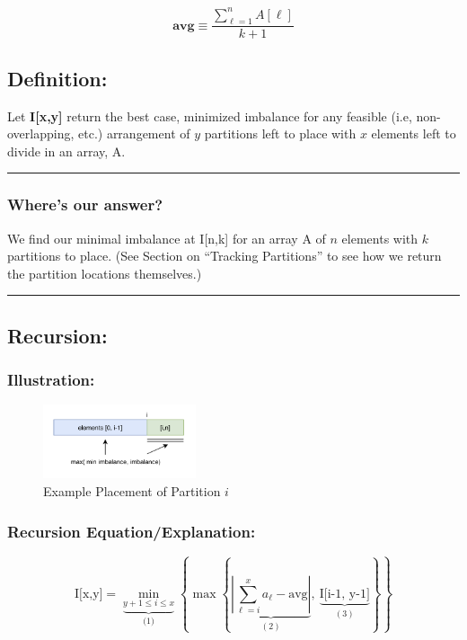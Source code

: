 \documentclass[conference]{styles/acmsiggraph}
\newcommand{\?}{\stackrel{?}{=}}
\begin{document}
$$\mathbf{avg} \equiv \frac{\sum^{n}_{\ell = 1}A[\ell]}{k+1}$$

\subsection{Definition:} \label{ImbalanceDef}
Let \textbf{I[x,y]} return the best case, minimized imbalance for any feasible (i.e, non-overlapping, etc.) arrangement of $y$ partitions left to place with $x$ elements left to divide in an array, A. \\

\rule{\textwidth}{0.4pt}
\subsubsection*{Where's our answer?}
We find our minimal imbalance at I[n,k] for an array A of $n$ elements with $k$ partitions to place. (See Section on \enquote{Tracking Partitions} to see how we return the partition locations themselves.)\\
\rule{\textwidth}{0.4pt}

\subsection{Recursion:}
\subsubsection*{Illustration:}
\begin{figure}[h!]
    \centering
    \includegraphics[width=0.4\textwidth]{Problem2Figs/CS124 PSET1_4 Diagrams.png}
    \caption{Example Placement of Partition $i$}
    \label{fig:histogram}
\end{figure}
\FloatBarrier
\subsubsection*{Recursion Equation/Explanation:}
$$\text{I[x,y]} = \underbrace{\min_{y+1 \leq i \leq x}}_{\text{(1)}} \left\{ \max \left \{ \underbrace{\left | \sum^{x}_{\ell = i} a_\ell - \text{avg} \right |}_{(2)},\ \underbrace{\text{I[i-1, y-1]}}_{(3)}\right \} \right \}$$
\end{document}
